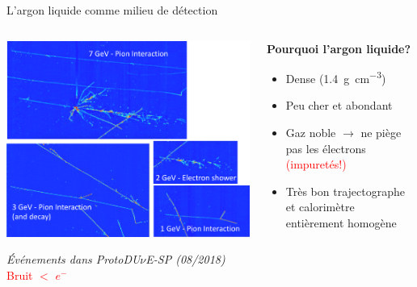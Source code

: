    \begin{frame}{L'argon liquide comme milieu de détection}
        \begin{scriptsize}
           	\begin{columns}
           		\begin{column}{0.6\textwidth}
           			\centering
           			\includegraphics[width=\textwidth]{./pictures/SP_evt.png}\\
           			\flushleft
           			\begin{footnotesize}\textit{Événements dans ProtoDU$\nu$E-SP (08/2018)}\\
           			\textcolor{red}{Bruit $<$  $e^{-}$}\end{footnotesize}
           		\end{column}
           		\begin{column}{0.4\textwidth}
           			\begin{footnotesize}
           				\textbf{Pourquoi l'argon liquide?}
           			\end{footnotesize}
           			\begin{itemize}
           				\item Dense (\SI{1.4}{\gram\per\centi\meter^3})
           				\item Peu cher et abondant
           				\item Gaz noble $\rightarrow$ ne piège pas les électrons \textcolor{red}{(\danger impuretés!)}
           				\item Très bon trajectographe et calorimètre entièrement homogène

\end{itemize}
\end{column}
\end{columns}
\end{scriptsize}
\end{frame}
